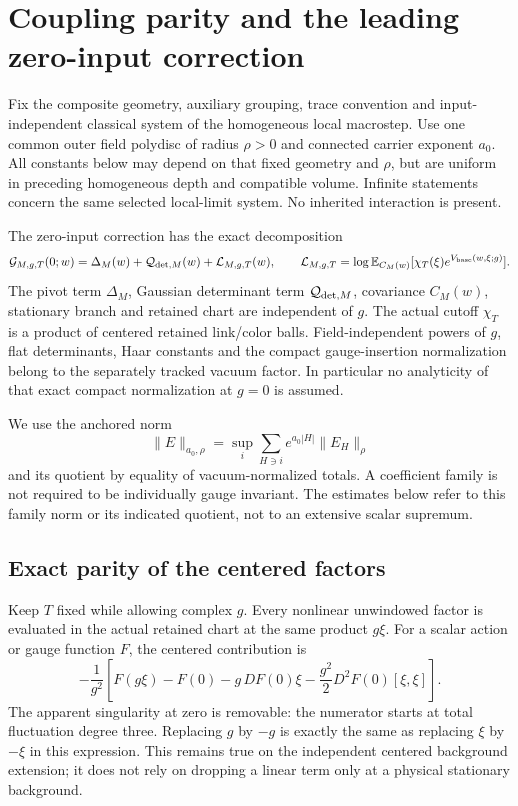 \section{Coupling parity and the leading zero-input correction}
\label{cgp-section}

Fix the composite geometry, auxiliary grouping, trace convention and
input-independent classical system of the homogeneous local macrostep.
Use one common outer field polydisc of radius $\rho>0$ and connected
carrier exponent $a_0$. All constants below may depend on that fixed
geometry and $\rho$, but are uniform in preceding homogeneous depth
and compatible volume. Infinite statements concern the same selected
local-limit system. No inherited interaction is present.

The zero-input correction has the exact decomposition
\begin{equation}
 \mathcal G_{M,g,T}(0;w)
   =\Delta_M(w)+\mathcal Q_{{\rm det},M}(w)
                         +\mathcal L_{M,g,T}(w),
 \qquad
 \mathcal L_{M,g,T}
  =\log\mathbb E_{C_M(w)}
          [\chi_T(\xi)e^{V_{\rm base}(w,\xi;g)}].
 \label{cgp-decomposition}
\end{equation}
The pivot term $\Delta_M$, Gaussian determinant term
$\mathcal Q_{{\rm det},M}$, covariance $C_M(w)$, stationary branch
and retained chart are independent of $g$. The actual cutoff
$\chi_T$ is a product of centered retained link/color balls.
Field-independent powers of $g$, flat determinants, Haar constants
and the compact gauge-insertion normalization belong to the
separately tracked vacuum factor. In particular no analyticity of
that exact compact normalization at $g=0$ is assumed.

We use the anchored norm
\[
 \|E\|_{a_0,\rho}
   =\sup_i\sum_{H\ni i}e^{a_0|H|}\|E_H\|_\rho
\]
and its quotient by equality of vacuum-normalized totals. A
coefficient family is not required to be individually gauge invariant.
The estimates below refer to this family norm or its indicated quotient,
not to an extensive scalar supremum.

\subsection{Exact parity of the centered factors}
\label{cgp-parity-section}

Keep $T$ fixed while allowing complex $g$. Every nonlinear
unwindowed factor is evaluated in the actual retained chart at the
same product $g\xi$. For a scalar action or gauge function $F$,
the centered contribution is
\begin{equation}
 -\frac1{g^2}\left[
 F(g\xi)-F(0)-g\,DF(0)\xi
                 -\frac{g^2}{2}D^2F(0)[\xi,\xi]\right].
 \label{cgp-centered-factor}
\end{equation}
The apparent singularity at zero is removable: the numerator
starts at total fluctuation degree three. Replacing $g$ by $-g$
is exactly the same as replacing $\xi$ by $-\xi$ in this
expression. This remains true on the independent centered
background extension; it does not rely on dropping a linear
term only at a physical stationary background.

